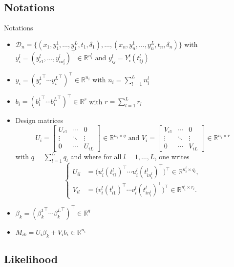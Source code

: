\documentclass{beamer}
\newcommand{\R}{\mathbb R}
\newcommand{\cD}{\mathcal D}
\begin{document}
\subsection{Notations}

\begin{frame}{Notations}

\footnotesize
\begin{itemize}
  \item<1-> $\cD_n = \big\{ (x_1, y_1^1, \ldots, y_1^L, t_1, \delta_1), \ldots, (x_n, y_n^1, \ldots, y_n^L, t_n, \delta_n) \big\}$ with $y_i^l=(y_{i1}^l, \ldots, y_{in_i^l}^l)^\top \in \R^{n_i^l} \text{ and } y_{ij}^l=Y_i^l(t_{ij}^l)$
  \item<2-> $y_i = ({y_i^1}^\top \cdots {y_i^L}^\top)^\top \in \R^{n_i}$ with $n_i = \sum_{l=1}^L n_i^l$
  \item<3-> $b_i = ({b_i^1}^\top \cdots {b_i^L}^\top)^\top \in \R^r$ with $r = \sum_{l=1}^L r_l$
  \item<4-> Design matrices 
  \[ U_i = 
\begin{bmatrix}
  U_{i1} & \cdots & 0\\
  \vdots &  \ddots & \vdots \\
  0 & \cdots & U_{iL}
\end{bmatrix} 
\in \R^{n_i \times q}
\text{ and }
V_i = 
\begin{bmatrix}
  V_{i1} & \cdots & 0\\
  \vdots &  \ddots & \vdots \\
  0 & \cdots & V_{iL}
\end{bmatrix}
\in \R^{n_i \times r}
\]
with $q = \sum_{l=1}^L q_l$ and where for all $l=1, \ldots, L$, one writes
\[
\left\{
    \begin{array}{ll}
        U_{il} &= \big(u_i^l(t_{i1}^l)^\top \cdots u_i^l(t_{in_i^l}^l)^\top\big)^\top \in \R^{n_i^l \times q_l},\\
        V_{il} &= \big(v_i^l(t_{i1}^l)^\top \cdots v_i^l(t_{in_i^l}^l)^\top\big)^\top \in \R^{n_i^l \times r_l}.
    \end{array}
\right.
\]
  \item<5-> $\beta_k = ({\beta_k^1}^\top \cdots {\beta_k^L}^\top)^\top \in \R^q$
  \item<6-> $M_{ik} = U_i\beta_k + V_ib_i \in \R^{n_i}$
\end{itemize}

\end{frame}

\subsection{Likelihood}
\end{document}
